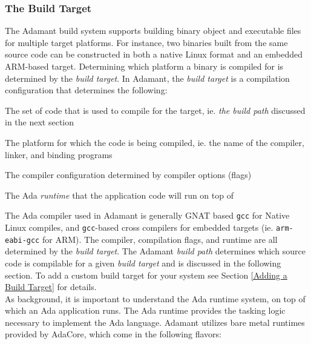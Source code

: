 \subsubsection{The Build Target} \label{The Build Target}

The Adamant build system supports building binary object and executable files for multiple target platforms. For instance, two binaries built from the same source code can be constructed in both a native Linux format and an embedded ARM-based target. Determining which platform a binary is compiled for is determined by the \textit{build target}. In Adamant, the \textit{build target} is a compilation configuration that determines the following:

\vspace{5mm} %
\begin{spacedenumerate}
  \item The set of code that is used to compile for the target, ie. \textit{the build path} discussed in the next section
  \item The platform for which the code is being compiled, ie. the name of the compiler, linker, and binding programs
  \item The compiler configuration determined by compiler options (flags)
  \item The Ada \textit{runtime} that the application code will run on top of
\end{spacedenumerate}
\vspace{5mm} %

The Ada compiler used in Adamant is generally GNAT based \texttt{gcc} for Native Linux compiles, and \texttt{gcc}-based cross compilers for embedded targets (ie. \texttt{arm-eabi-gcc} for ARM). The compiler, compilation flags, and runtime are all determined by the \textit{build target}. The Adamant \textit{build path} determines which source code is compilable for a given \textit{build target} and is discussed in the following section. To add a custom build target for your system see Section \ref{Adding a Build Target} for details. \\

As background, it is important to understand the Ada runtime system, on top of which an Ada application runs. The Ada runtime provides the tasking logic necessary to implement the Ada language. Adamant utilizes bare metal runtimes provided by AdaCore, which come in the following flavors:

